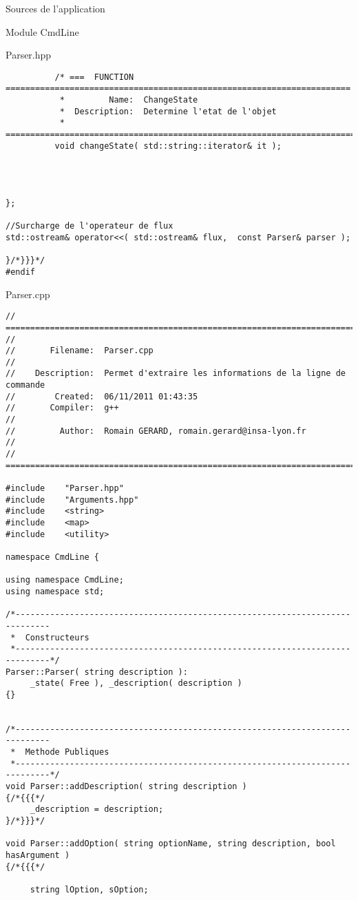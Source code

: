 \documentclass{article}
\begin{document}
\begin{section}{Sources de l'application}
\begin{subsection}{Module CmdLine}
\begin{paragraph}{Parser.hpp}
\begin{verbatim}
          /* ===  FUNCTION  ======================================================================
           *         Name:  ChangeState
           *  Description:  Determine l'etat de l'objet
           * =====================================================================================*/
          void changeState( std::string::iterator& it );




};

//Surcharge de l'operateur de flux
std::ostream& operator<<( std::ostream& flux,  const Parser& parser );

}/*}}}*/
#endif

      \end{verbatim}
      \end{paragraph}
   

\newpage
  \begin{paragraph}{Parser.cpp}
      \begin{verbatim}
// =====================================================================================
//
//       Filename:  Parser.cpp
//
//    Description:  Permet d'extraire les informations de la ligne de commande
//        Created:  06/11/2011 01:43:35
//       Compiler:  g++
//
//         Author:  Romain GERARD, romain.gerard@insa-lyon.fr
//
// =====================================================================================

#include    "Parser.hpp"
#include    "Arguments.hpp"
#include    <string>
#include    <map>
#include    <utility>

namespace CmdLine {

using namespace CmdLine;
using namespace std;

/*-----------------------------------------------------------------------------
 *  Constructeurs
 *-----------------------------------------------------------------------------*/
Parser::Parser( string description ):
     _state( Free ), _description( description )
{}


/*-----------------------------------------------------------------------------
 *  Methode Publiques
 *-----------------------------------------------------------------------------*/
void Parser::addDescription( string description )
{/*{{{*/
     _description = description;
}/*}}}*/

void Parser::addOption( string optionName, string description, bool hasArgument )
{/*{{{*/

     string lOption, sOption;


\end{verbatim}
\end{paragraph}
\end{subsection}
\end{section}
\end{document}
